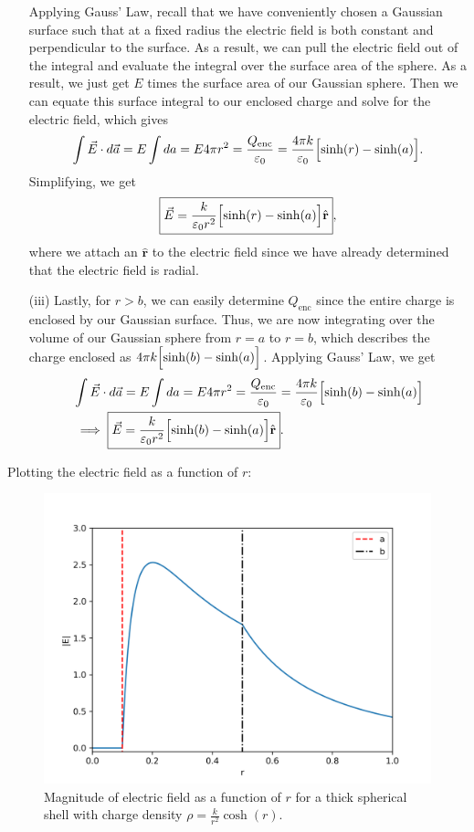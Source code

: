 \documentclass{article}
\newcommand{\rhat}{\hat{\textbf{r}}}
\begin{document}
\begin{itemize}
	Applying Gauss' Law, recall that we have conveniently chosen a Gaussian surface such that at a fixed radius the electric field is both constant and perpendicular to the surface. As a result, we can pull the electric field out of the integral and evaluate the integral over the surface area of the sphere. As a result, we just get $E$ times the surface area of our Gaussian sphere. Then we can equate this surface integral to our enclosed charge and solve for the electric field, which gives
	\begin{align*}
		\int \vec{E}\cdot d\vec{a} = E\int da = E 4\pi r^2 = \frac{Q_\textrm{enc}}{\varepsilon_0} = \frac{4\pi k}{\varepsilon_0} \Bigl[\sinh(r) - \sinh(a)\Bigr].
	\end{align*}
	Simplifying, we get
	\begin{equation}
		\boxed{\vec{E} = \frac{k}{\varepsilon_0r^2}\Bigl[\sinh(r) - \sinh(a)\Bigr]\rhat},
	\end{equation}
	where we attach an $\rhat$ to the electric field since we have already determined that the electric field is radial.

	\item[(iii)] Lastly, for $r > b$, we can easily determine $Q_\textrm{enc}$ since the entire charge is enclosed by our Gaussian surface. Thus, we are now integrating over the volume of our Gaussian sphere from $r=a$ to $r=b$, which describes the charge enclosed as $4\pi k \Bigl[\sinh(b) - \sinh(a)\Bigr]$. Applying Gauss' Law, we get
	\begin{align*}
		&\int \vec{E}\cdot d\vec{a} = E\int da = E 4\pi r^2 = \frac{Q_\textrm{enc}}{\varepsilon_0} = \frac{4\pi k}{\varepsilon_0} \Bigl[\sinh(b) - \sinh(a)\Bigr] \\
		&\implies \boxed{\vec{E} = \frac{k}{\varepsilon_0r^2}\Bigl[\sinh(b) - \sinh(a)\Bigr]\rhat}.
	\end{align*}
\end{itemize}

Plotting the electric field as a function of $r$:
\begin{figure}[htpb]
	\centering
	\includegraphics[width = .65\textwidth]{E_thick_shell.png}
\caption{Magnitude of electric field as a function of $r$ for a thick spherical shell with charge density $\rho = \frac{k}{r^2}\cosh(r)$.}\label{fig:thick_shell}
\end{figure}
\end{document}
